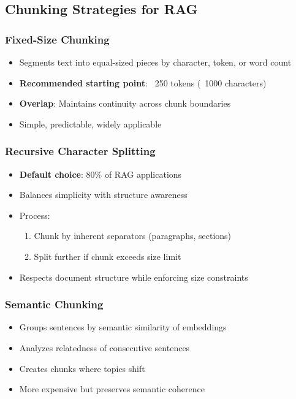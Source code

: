 \documentclass[11pt,letterpaper]{article}
\begin{document}
\subsection{Chunking Strategies for RAG}

\subsubsection{Fixed-Size Chunking}
\begin{itemize}[leftmargin=*]
    \item Segments text into equal-sized pieces by character, token, or word count
    \item \textbf{Recommended starting point}: ~250 tokens (~1000 characters)
    \item \textbf{Overlap}: Maintains continuity across chunk boundaries
    \item Simple, predictable, widely applicable
\end{itemize}

\subsubsection{Recursive Character Splitting}
\begin{itemize}[leftmargin=*]
    \item \textbf{Default choice}: 80\% of RAG applications
    \item Balances simplicity with structure awareness
    \item Process:
    \begin{enumerate}
        \item Chunk by inherent separators (paragraphs, sections)
        \item Split further if chunk exceeds size limit
    \end{enumerate}
    \item Respects document structure while enforcing size constraints
\end{itemize}

\subsubsection{Semantic Chunking}
\begin{itemize}[leftmargin=*]
    \item Groups sentences by semantic similarity of embeddings
    \item Analyzes relatedness of consecutive sentences
    \item Creates chunks where topics shift
    \item More expensive but preserves semantic coherence
\end{itemize}
\end{document}
